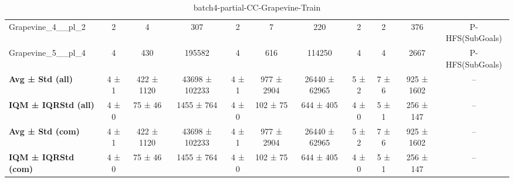 \begin{table}[!ht]
\begin{tabular}{l|ccc|ccc|cccc}
Grapevine\_4\_\_pl\_2 & 2 & 4 & 307 & 2 & 7 & 220 & 2 & 2 & 376 & P-HFS(SubGoals) \\
Grapevine\_5\_\_pl\_4 & 4 & 430 & 195582 & 4 & 616 & 114250 & 4 & 4 & 2667 & P-HFS(SubGoals) \\
\hline
\textbf{Avg ± Std (all)} & 4 ± 1 & 422 ± 1120 & 43698 ± 102233 & 4 ± 1 & 977 ± 2904 & 26440 ± 62965 & 5 ± 2 & 7 ± 6 & 925 ± 1602 & -- \\
\textbf{IQM ± IQRStd (all)} & 4 ± 0 & 75 ± 46 & 1455 ± 764 & 4 ± 0 & 102 ± 75 & 644 ± 405 & 4 ± 0 & 5 ± 1 & 256 ± 147 & -- \\
\textbf{Avg ± Std (com)} & 4 ± 1 & 422 ± 1120 & 43698 ± 102233 & 4 ± 1 & 977 ± 2904 & 26440 ± 62965 & 5 ± 2 & 7 ± 6 & 925 ± 1602 & -- \\
\textbf{IQM ± IQRStd (com)} & 4 ± 0 & 75 ± 46 & 1455 ± 764 & 4 ± 0 & 102 ± 75 & 644 ± 405 & 4 ± 0 & 5 ± 1 & 256 ± 147 & -- \\
\end{tabular}
\caption{batch4-partial-CC-Grapevine-Train}
\label{tab:batch4_partial_CC-Grapevine_comparison_train}
\end{table}

